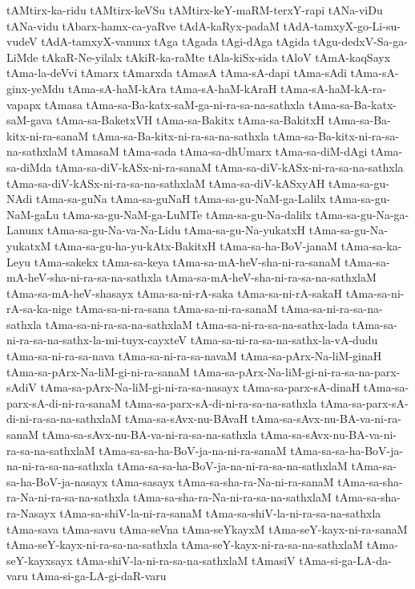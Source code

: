 {tAMtirx-ka-ridu
tAMtirx-keVSu
tAMtirx-keY-maRM-terxY-rapi
tANa-viDu
tANa-vidu
tAbarx-hamx-ca-yaRve
tAdA-kaRyx-padaM
tAdA-tamxyX-go-Li-su-vudeV
tAdA-tamxyX-vanunx
tAga
tAgada
tAgi-dAga
tAgida
tAgu-dedxV-Sa-ga-LiMde
tAkaR-Ne-yilalx
tAkiR-ka-raMte
tAla-kiSx-sida
tAloV
tAmA-kaqSayx
tAma-la-deVvi
tAmarx
tAmarxda
tAmasA
tAma-sA-dapi
tAma-sAdi
tAma-sA-ginx-yeMdu
tAma-sA-haM-kAra
tAma-sA-haM-kAraH
tAma-sA-haM-kA-ra-vapapx
tAmasa
tAma-sa-Ba-katx-saM-ga-ni-ra-sa-na-sathxla
tAma-sa-Ba-katx-saM-gava
tAma-sa-BaketxVH
tAma-sa-Bakitx
tAma-sa-BakitxH
tAma-sa-Ba-kitx-ni-ra-sanaM
tAma-sa-Ba-kitx-ni-ra-sa-na-sathxla
tAma-sa-Ba-kitx-ni-ra-sa-na-sathxlaM
tAmasaM
tAma-sada
tAma-sa-dhUmarx
tAma-sa-diM-dAgi
tAma-sa-diMda
tAma-sa-diV-kASx-ni-ra-sanaM
tAma-sa-diV-kASx-ni-ra-sa-na-sathxla
tAma-sa-diV-kASx-ni-ra-sa-na-sathxlaM
tAma-sa-diV-kASxyAH
tAma-sa-gu-NAdi
tAma-sa-guNa
tAma-sa-guNaH
tAma-sa-gu-NaM-ga-Lalilx
tAma-sa-gu-NaM-gaLu
tAma-sa-gu-NaM-ga-LuMTe
tAma-sa-gu-Na-dalilx
tAma-sa-gu-Na-ga-Lanunx
tAma-sa-gu-Na-va-Na-Lidu
tAma-sa-gu-Na-yukatxH
tAma-sa-gu-Na-yukatxM
tAma-sa-gu-ha-yu-kAtx-BakitxH
tAma-sa-ha-BoV-janaM
tAma-sa-ka-Leyu
tAma-sakekx
tAma-sa-keya
tAma-sa-mA-heV-sha-ni-ra-sanaM
tAma-sa-mA-heV-sha-ni-ra-sa-na-sathxla
tAma-sa-mA-heV-sha-ni-ra-sa-na-sathxlaM
tAma-sa-mA-heV-shasayx
tAma-sa-ni-rA-saka
tAma-sa-ni-rA-sakaH
tAma-sa-ni-rA-sa-ka-nige
tAma-sa-ni-ra-sana
tAma-sa-ni-ra-sanaM
tAma-sa-ni-ra-sa-na-sathxla
tAma-sa-ni-ra-sa-na-sathxlaM
tAma-sa-ni-ra-sa-na-sathx-lada
tAma-sa-ni-ra-sa-na-sathx-la-mi-tuyx-cayxteV
tAma-sa-ni-ra-sa-na-sathx-la-vA-dudu
tAma-sa-ni-ra-sa-nava
tAma-sa-ni-ra-sa-navaM
tAma-sa-pArx-Na-liM-ginaH
tAma-sa-pArx-Na-liM-gi-ni-ra-sanaM
tAma-sa-pArx-Na-liM-gi-ni-ra-sa-na-parx-sAdiV
tAma-sa-pArx-Na-liM-gi-ni-ra-sa-nasayx
tAma-sa-parx-sA-dinaH
tAma-sa-parx-sA-di-ni-ra-sanaM
tAma-sa-parx-sA-di-ni-ra-sa-na-sathxla
tAma-sa-parx-sA-di-ni-ra-sa-na-sathxlaM
tAma-sa-sAvx-nu-BAvaH
tAma-sa-sAvx-nu-BA-va-ni-ra-sanaM
tAma-sa-sAvx-nu-BA-va-ni-ra-sa-na-sathxla
tAma-sa-sAvx-nu-BA-va-ni-ra-sa-na-sathxlaM
tAma-sa-sa-ha-BoV-ja-na-ni-ra-sanaM
tAma-sa-sa-ha-BoV-ja-na-ni-ra-sa-na-sathxla
tAma-sa-sa-ha-BoV-ja-na-ni-ra-sa-na-sathxlaM
tAma-sa-sa-ha-BoV-ja-nasayx
tAma-sasayx
tAma-sa-sha-ra-Na-ni-ra-sanaM
tAma-sa-sha-ra-Na-ni-ra-sa-na-sathxla
tAma-sa-sha-ra-Na-ni-ra-sa-na-sathxlaM
tAma-sa-sha-ra-Nasayx
tAma-sa-shiV-la-ni-ra-sanaM
tAma-sa-shiV-la-ni-ra-sa-na-sathxla
tAma-sava
tAma-savu
tAma-seVna
tAma-seYkayxM
tAma-seY-kayx-ni-ra-sanaM
tAma-seY-kayx-ni-ra-sa-na-sathxla
tAma-seY-kayx-ni-ra-sa-na-sathxlaM
tAma-seY-kayxsayx
tAma-shiV-la-ni-ra-sa-na-sathxlaM
tAmasiV
tAma-si-ga-LA-da-varu
tAma-si-ga-LA-gi-daR-varu
}
